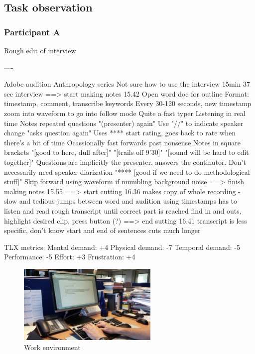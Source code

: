 \subsection{Task observation}

\subsubsection{Participant A}
Rough edit of interview

----

Adobe audition
Anthropology series
Not sure how to use the interview
15min 37 sec interview
==> start making notes 15.42
Open word doc for outline
Format: timestamp, comment, transcribe keywords
Every 30-120 seconds, new timestamp
zoom into waveform to go into follow mode
Quite a fast typer
Listening in real time
Notes repeated questions "(presenter) again"
Use "//" to indicate speaker change
"asks question again"
Uses **** start rating, goes back to rate when there's a bit of time
Ocassionally fast forwards past nonsense
Notes in square brackets
"[good to here, dull after]"
"[trails off 9'30]"
"[sound will be hard to edit together]"
Questions are implicitly the presenter, answers the continutor. Don't
necessarily need speaker diarization
"**** [good if we need to do methodological stuff]"
Skip forward using waveform if mumbling background noise
==> finish making notes 15.55
==> start cutting 16.36
makes copy of whole recording - slow and tedious
jumps between word and audition using timestamps
has to listen and read rough transcript until correct part is reached
find in and outs, highlight desired clip, press button (?)
==> end sutting 16.41
transcript is less specific, don't know start and end of sentences
cuts much longer

TLX metrics:
Mental demand: +4
Physical demand: -7
Temporal demand: -5
Performance: -5
Effort: +3
Frustration: +4

\begin{figure}[ht]
  \centering
  \includegraphics[width=0.6\textwidth]{figs/study2-participantA-workspace.jpg}
  \caption{Work environment}
  \label{fig:study2-participantA-workspace}
\end{figure}

